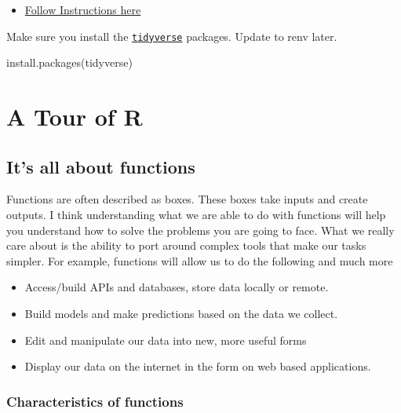 \documentclass[
]{book}
\newenvironment{Shaded}{\begin{snugshade}}{\end{snugshade}}
\newcommand{\FunctionTok}[1]{\textcolor[rgb]{0.00,0.00,0.00}{#1}}
\newcommand{\NormalTok}[1]{#1}
\newcommand{\StringTok}[1]{\textcolor[rgb]{0.31,0.60,0.02}{#1}}
\providecommand{\tightlist}{%
  \setlength{\itemsep}{0pt}\setlength{\parskip}{0pt}}
\begin{document}
\begin{itemize}
  \begin{itemize}
  \tightlist
  \item
    \href{https://towardsdatascience.com/how-to-use-the-reddit-api-in-python-5e05ddfd1e5c}{Follow Instructions here}
  \end{itemize}
\end{itemize}

Make sure you install the \href{https://www.tidyverse.org/}{\texttt{tidyverse}} packages. Update to renv later.

\begin{Shaded}
\begin{Highlighting}[]
\FunctionTok{install.packages}\NormalTok{(}\StringTok{\textquotesingle{}tidyverse\textquotesingle{}}\NormalTok{)}
\end{Highlighting}
\end{Shaded}

\hypertarget{a-tour-of-r}{%
\chapter{A Tour of R}\label{a-tour-of-r}}

\hypertarget{its-all-about-functions}{%
\section{It's all about functions}\label{its-all-about-functions}}

Functions are often described as boxes. These boxes take inputs and create outputs. I think understanding what we are able to do with functions will help you understand how to solve the problems you are going to face. What we really care about is the ability to port around complex tools that make our tasks simpler. For example, functions will allow us to do the following and much more

\begin{itemize}
\tightlist
\item
  Access/build APIs and databases, store data locally or remote.
\item
  Build models and make predictions based on the data we collect.
\item
  Edit and manipulate our data into new, more useful forms
\item
  Display our data on the internet in the form on web based applications.
\end{itemize}

\hypertarget{characteristics-of-functions}{%
\subsection{Characteristics of functions}\label{characteristics-of-functions}}
\end{document}
